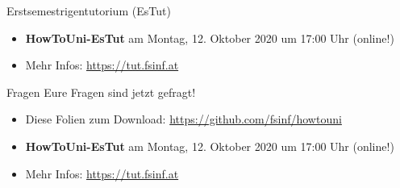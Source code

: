 \documentclass{beamer}
\begin{document}
\begin{frame}{Erstsemestrigentutorium (EsTut)}
    \begin{itemize}
        \item \textbf{HowToUni-EsTut} am Montag, 12. Oktober 2020 um 17:00 Uhr (online!)
        \item Mehr Infos: \url{https://tut.fsinf.at}
    \end{itemize}
\end{frame}

\begin{frame}{Fragen}
    \centering Eure Fragen sind jetzt gefragt!
    \vspace{2cm}
    \begin{itemize}
        \item \small Diese Folien zum Download: \url{https://github.com/fsinf/howtouni}
        \item \small \textbf{HowToUni-EsTut} am Montag, 12. Oktober 2020 um 17:00 Uhr
            (online!)
        \item \small Mehr Infos: \url{https://tut.fsinf.at}
    \end{itemize}
\end{frame}
\end{document}
